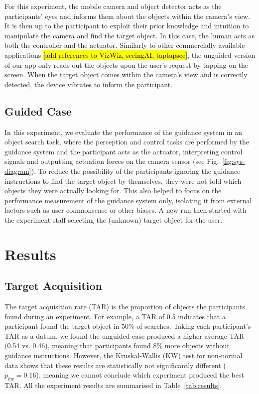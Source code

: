 \documentclass[runningheads]{llncs}
\DeclareRobustCommand{\tofix}[1]{{\sethlcolor{yellow}\hl{[#1]}}}
\begin{document}
For this experiment, the mobile camera and object detector acts as the participants' eyes and informs them about the objects within the camera's view.
It is then up to the participant to exploit their prior knowledge and intuition to manipulate the camera and find the target object. 
In this case, the human acts as both the controller and the actuator. 
Similarly to other commercially available applications \tofix{add references to VizWiz, seeingAI, taptapsee}, the unguided version of our app only reads out the objects upon the user's request by tapping on the screen. 
When the target object comes within the camera's view and is correctly detected, the device vibrates to inform the participant. 


\subsection{Guided Case}

In this experiment, we evaluate the performance of the guidance system in an object search task, where the perception and control tasks are performed by the guidance system and the participant acts as the actuator, interpreting control signals and outputting actuation forces on the camera sensor (see Fig.~\ref{fig:sys-diagram}). 
%
To reduce the possibility of the participants ignoring the guidance instructions to find the target object by themselves, they were not told which objects they were actually looking for.
This also helped to focus on the performance measurement of the guidance system only, isolating it from external factors such as user commonsense or other biases.
A new run then started with the experiment staff selecting the (unknown) target object for the user.

\section{Results}\label{sec:results}

\subsection{Target Acquisition}

The target acquisition rate (TAR) is the proportion of objects the participants found during an experiment. 
For example, a TAR of 0.5 indicates that a participant found the target object in 50\% of searches. 
Taking each participant's TAR as a datum, we found the unguided case produced a higher average TAR (0.54 vs. 0.46), meaning that participants found 8\% more objects without guidance instructions.
However, the Kruskal-Wallis (KW) test for non-normal data shows that these results are statistically not significantly different ($p_{kw} = 0.16$), meaning we cannot conclude which experiment produced the best TAR. 
All the experiment results are summarised in Table~\ref{tab:results}. 
\end{document}
